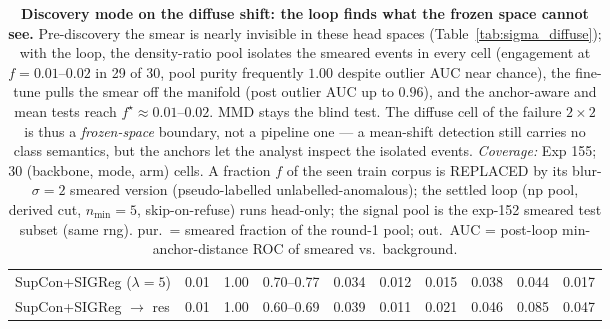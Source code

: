 \begin{table}[t]
\begin{tabular}{lccccccccc}
SupCon+SIGReg ($\lambda{=}5$) & 0.01 & 1.00 & 0.70--0.77 & 0.034 & 0.012 & 0.015 & 0.038 & 0.044 & 0.017 \\
\quad SupCon+SIGReg $\to$ res & 0.01 & 1.00 & 0.60--0.69 & 0.039 & 0.011 & 0.021 & 0.046 & 0.085 & 0.047 \\
\bottomrule
\end{tabular}
\caption{\textbf{Discovery mode on the diffuse shift: the loop finds what the frozen space cannot see.}  Pre-discovery the smear is nearly invisible in these head spaces (Table~\ref{tab:sigma_diffuse}); with the loop, the density-ratio pool isolates the smeared events in every cell (engagement at $f{=}0.01$--$0.02$ in 29 of 30, pool purity frequently $1.00$ despite outlier AUC near chance), the fine-tune pulls the smear off the manifold (post outlier AUC up to $0.96$), and the anchor-aware and mean tests reach $f^\star{\approx}0.01$--$0.02$.  MMD stays the blind test.  The diffuse cell of the failure $2\times2$ is thus a \emph{frozen-space} boundary, not a pipeline one --- a mean-shift detection still carries no class semantics, but the anchors let the analyst inspect the isolated events. \emph{Coverage:} Exp 155; 30 (backbone, mode, arm) cells.  A fraction $f$ of the seen train corpus is REPLACED by its blur-$\sigma{=}2$ smeared version (pseudo-labelled unlabelled-anomalous); the settled loop (np pool, derived cut, $n_{\min}{=}5$, skip-on-refuse) runs head-only; the signal pool is the exp-152 smeared test subset (same rng).  pur.\ = smeared fraction of the round-1 pool; out.\ AUC = post-loop min-anchor-distance ROC of smeared vs.\ background.}
\label{tab:sigma_diffuse_post}
\end{table}
